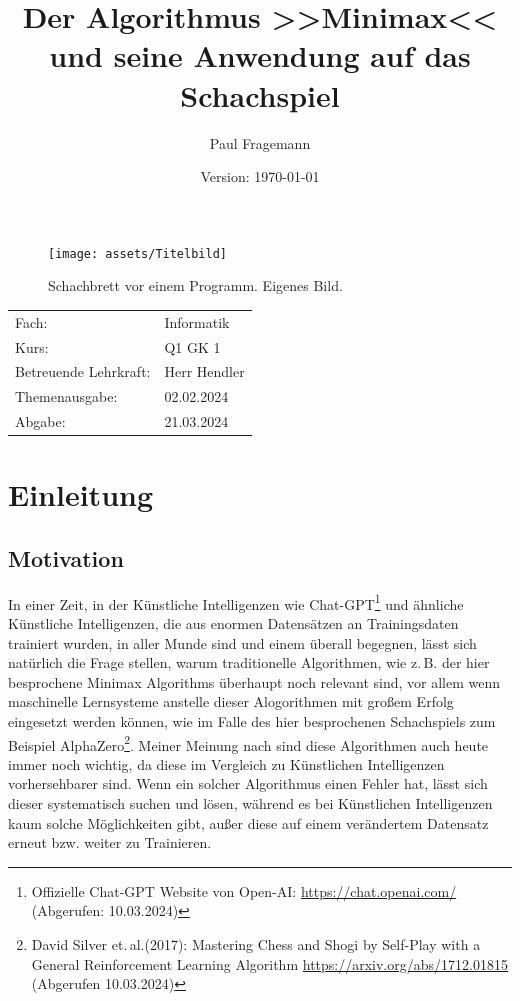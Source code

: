 \documentclass[12pt, a4paper, oneside, openright]{article}
\title{Der Algorithmus >>Minimax<< und seine Anwendung auf das Schachspiel}
\author{Paul Fragemann}
\date{Version: \today}
\newcommand \zB{z.\,B.\xspace }
\newcommand \bzw{bzw.\xspace }
\newcommand \etal{et.\,al.\xspace }
\begin{document}
\maketitle
\thispagestyle{empty}

\begin{figure}[H]
    \centering
    \texttt{[image: assets/Titelbild]}
    \caption[Schachbrett vor einem Programm]{Schachbrett vor einem Programm. Eigenes Bild.}
    \label{fig:Titelbild}
\end{figure}

\vfill

\noindent
\begin{tabular}{p{4cm}l}
    Fach:                   & Informatik \tabularnewline
    Kurs:                   & Q1 GK 1 \tabularnewline
    Betreuende Lehrkraft:   & Herr Hendler \tabularnewline
    Themenausgabe:          & 02.02.2024 \tabularnewline
    Abgabe:                 & 21.03.2024 \tabularnewline
\end{tabular}

\newpage

\thispagestyle{empty}
\tableofcontents



\newpage
\setcounter{page}{3}
\section{Einleitung}\label{sec:einleitung}
\subsection{Motivation}\label{subsec:motivation}
In einer Zeit, in der Künstliche Intelligenzen wie Chat-GPT\footnote{Offizielle Chat-GPT Website von Open-AI: \url{https://chat.openai.com/} (Abgerufen: 10.03.2024)} und ähnliche Künstliche Intelligenzen, die aus enormen Datensätzen an Trainingsdaten trainiert wurden, in aller Munde sind und einem überall begegnen, lässt sich natürlich die Frage stellen, warum traditionelle Algorithmen, wie \zB der hier besprochene Minimax Algorithms überhaupt noch relevant sind, vor allem wenn maschinelle Lernsysteme anstelle dieser Alogorithmen mit großem Erfolg eingesetzt werden können, wie im Falle des hier besprochenen Schachspiels zum Beispiel AlphaZero\footnote{David Silver \etal (2017): Mastering Chess and Shogi by Self-Play with a General Reinforcement Learning Algorithm \url{https://arxiv.org/abs/1712.01815} (Abgerufen 10.03.2024)}.
Meiner Meinung nach sind diese Algorithmen auch heute immer noch wichtig, da diese im Vergleich zu Künstlichen Intelligenzen vorhersehbarer sind.
Wenn ein solcher Algorithmus einen Fehler hat, lässt sich dieser systematisch suchen und lösen, während es bei Künstlichen Intelligenzen kaum solche Möglichkeiten gibt, außer diese auf einem verändertem Datensatz erneut \bzw weiter zu Trainieren.
\end{document}
